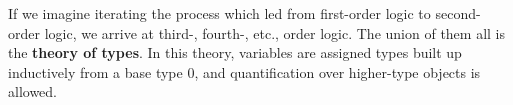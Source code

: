If we imagine iterating the process which led from first-order logic to second-order logic, we arrive at third-, fourth-, etc., order logic. The union of them all is the \textbf{theory of types}. In this theory, variables are assigned types built up inductively from a base type $0$, and quantification over higher-type objects is allowed.

